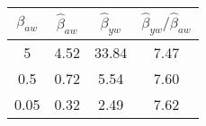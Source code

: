 \documentclass[10pt]{article}
\begin{document}
\begin{center}
    \begin{tabular}{||c c c c||} 
     \hline
     $\beta_{aw}$ & $\hat{\beta}_{aw}$ & $\hat{\beta}_{yw}$ & $\widehat{\beta}_{y w} / \widehat{\beta}_{a w}$ \\ [0.5ex] 
     \hline\hline
     5 & 4.52 & 33.84 & 7.47 \\ 
     \hline
     0.5 & 0.72 & 5.54 & 7.60 \\
     \hline
     0.05 & 0.32 & 2.49 & 7.62 \\
     \hline
    \end{tabular}
\end{center}

\end{document}
